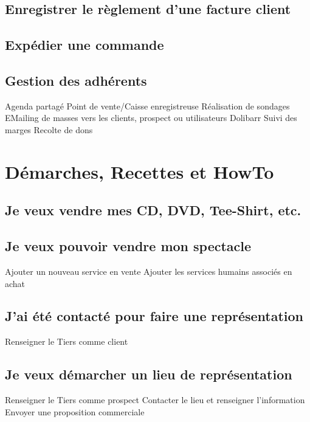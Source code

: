 \documentclass[a4paper]{article}
\begin{document}
\subsection{Enregistrer le règlement d'une facture client}
\label{sec:DolibarrPaiementFactureClient}

\subsection{Expédier une commande}
\label{sec:DolibarrExpedierCommande}

\subsection{Gestion des adhérents}
\label{sec:DolibarrGestionAdherents}

Agenda partagé
Point de vente/Caisse enregistreuse
Réalisation de sondages
EMailing de masses vers les clients, prospect ou utilisateurs Dolibarr
Suivi des marges
Recolte de dons 


\section{Démarches, Recettes et HowTo}
\label{sec:HowTo}

\subsection{Je veux vendre mes CD, DVD, Tee-Shirt, etc.}
\label{sec:HowToVendreMerchandising}

\subsection{Je veux pouvoir vendre mon spectacle}
\label{sec:HowToVendreSpectacle}
Ajouter un nouveau service en vente
Ajouter les services humains associés en achat

\subsection{J'ai été contacté pour faire une représentation}
\label{sec:HowToFaireRepresentation}
Renseigner le Tiers comme client

\subsection{Je veux démarcher un lieu de représentation}
\label{sec:HowToDemarcherUnLieu}
Renseigner le Tiers comme prospect
Contacter le lieu et renseigner l'information
Envoyer une proposition commerciale
\end{document}
